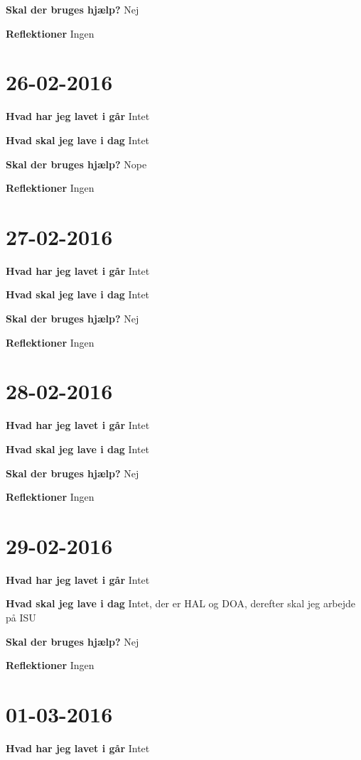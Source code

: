 \documentclass{article}
\begin{document}
	\textbf{Skal der bruges hjælp?} Nej
	
	\textbf{Reflektioner} Ingen
	
	\section{26-02-2016}
	
	\textbf{Hvad har jeg lavet i går} Intet
	
	\textbf{Hvad skal jeg lave i dag} Intet
	
	\textbf{Skal der bruges hjælp?} Nope
	
	\textbf{Reflektioner} Ingen
	
	\section{27-02-2016}
	
	\textbf{Hvad har jeg lavet i går} Intet
	
	\textbf{Hvad skal jeg lave i dag} Intet
	
	\textbf{Skal der bruges hjælp?} Nej
	
	\textbf{Reflektioner} Ingen
	
	\section{28-02-2016}
	
	\textbf{Hvad har jeg lavet i går} Intet
	
	\textbf{Hvad skal jeg lave i dag} Intet
	
	\textbf{Skal der bruges hjælp?} Nej
	
	\textbf{Reflektioner} Ingen
	
	\section{29-02-2016}
	
	\textbf{Hvad har jeg lavet i går} Intet
	
	\textbf{Hvad skal jeg lave i dag} Intet, der er HAL og DOA, derefter skal jeg arbejde på ISU
	
	\textbf{Skal der bruges hjælp?} Nej
	
	\textbf{Reflektioner} Ingen
	
	
	\section{01-03-2016}
		
	\textbf{Hvad har jeg lavet i går} Intet
		
\end{document}

